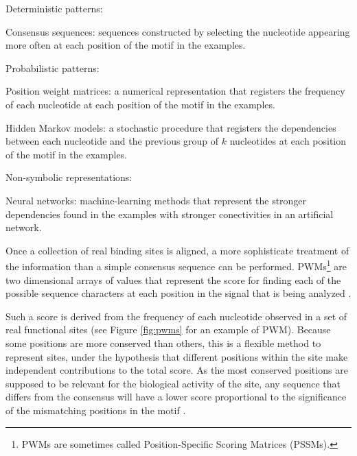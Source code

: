 \begin{mitemize}
\item
Deterministic patterns:
   \begin{mitemize}
   \item Consensus sequences:  
 sequences constructed by selecting the nucleotide appearing more often
at each position of the motif in the examples.
   \end{mitemize}
\item
Probabilistic patterns:
   \begin{mitemize}
   \item Position weight matrices: 
a numerical representation that registers the frequency of each
nucleotide at each position of the motif in the examples.
   \item Hidden Markov models: a stochastic procedure that registers the dependencies between each nucleotide and the previous group of $k$ nucleotides at each position of the motif in the examples.
   \end{mitemize}
\item
Non-symbolic representations:
   \begin{mitemize}
   \item Neural networks: machine-learning methods that represent the stronger dependencies found in the examples with stronger conectivities in an artificial network.
   \end{mitemize}
\end{mitemize}



 
Once a collection of real binding sites is aligned, a more sophisticate treatment of
the information than a simple consensus sequence can be performed. PWMs\footnote{PWMs are 
sometimes called Position-Specific Scoring Matrices (PSSMs).} are two dimensional arrays
of values that represent the score for finding each of the possible sequence
characters at each position in the signal that is being analyzed \citep{staden:1984a}.

Such a score is derived from the frequency of each nucleotide observed in a set of real 
functional sites (see Figure \ref{fig:pwms} for an example of PWM). Because 
some positions are more conserved than others, this is a flexible method to represent sites, 
under the hypothesis that different positions within the site make independent contributions 
to the total score. As the most conserved positions are 
supposed to be relevant for the biological activity of the site, any sequence
that differs from the consensus will have a lower score proportional
to the significance of the mismatching positions in the motif \citep{stormo:2000b}.

